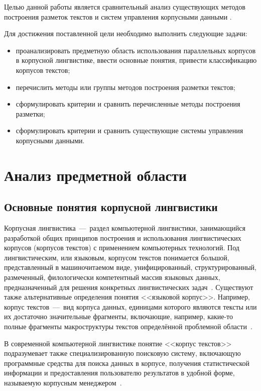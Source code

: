 Целью данной работы является сравнительный анализ существующих методов построения разметок текстов и систем управления корпусными данными .

Для достижения поставленной цели необходимо выполнить следующие задачи:
\begin{itemize}
	\item проанализировать предметную область использования параллельных корпусов в корпусной лингвистике, ввести основные понятия, привести классификацию корпусов текстов;
	\item перечислить методы или группы методов построения разметки текстов;
	\item сформулировать критерии и сравнить перечисленные методы построения разметки;
	\item сформулировать критерии и сравнить существующие системы управления корпусными данными.
\end{itemize}


\chapter{Анализ предметной области}
\section{Основные понятия корпусной лингвистики}

Корпусная лингвистика~---~раздел компьютерной лингвистики, занимающийся разработкой общих принципов построения и использования лингвистических корпусов (корпусов текстов) с применением компьютерных технологий. Под лингвистическим, или языковым, корпусом текстов понимается большой, представленный в машиночитаемом виде, унифицированный, структурированный, размеченный, филологически компетентный массив языковых данных, предназначенный для решения конкретных лингвистических задач~\cite{Zaharov}. Существуют также альтернативные определения понятия <<языковой корпус>>. Например, корпус текстов~---~вид корпуса данных, единицами которого являются тексты или их достаточно значительные фрагменты, включающие, например, какие-то полные фрагменты макроструктуры текстов определённой проблемной области~\cite{Grudeva}.

В современной компьютерной лингвистике понятие <<корпус текстов>> подразумевает также специализированную поисковую систему, включающую программные средства для поиска данных в корпусе, получения статистической информации и предоставления пользователю результатов в удобной форме, называемую корпусным менеджером~\cite{Zaharov}.

